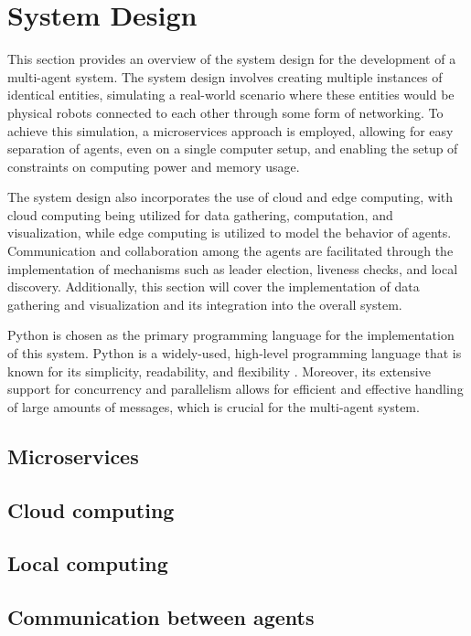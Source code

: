 \chapter{System Design}
This section provides an overview of the system design for the development of a multi-agent system. The system design involves creating multiple instances of identical entities, simulating a real-world scenario where these entities would be physical robots connected to each other through some form of networking. To achieve this simulation, a microservices approach is employed, allowing for easy separation of agents, even on a single computer setup, and enabling the setup of constraints on computing power and memory usage.

The system design also incorporates the use of cloud and edge computing, with cloud computing being utilized for data gathering, computation, and visualization, while edge computing is utilized to model the behavior of agents. Communication and collaboration among the agents are facilitated through the implementation of mechanisms such as leader election, liveness checks, and local discovery. Additionally, this section will cover the implementation of data gathering and visualization and its integration into the overall system.

Python is chosen as the primary programming language for the implementation of this system. Python is a widely-used, high-level programming language that is known for its simplicity, readability, and flexibility \cite{python_docs}. Moreover, its extensive support for concurrency and parallelism allows for efficient and effective handling of large amounts of messages, which is crucial for the multi-agent system.
\section{Microservices}


\section{Cloud computing}


\section{Local computing}


\section{Communication between agents}


